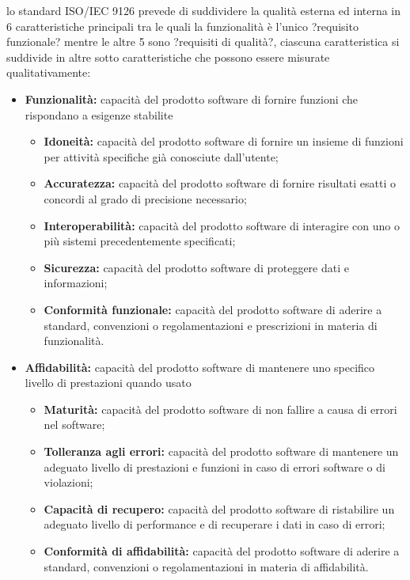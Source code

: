 \documentclass[a4paper]{article}
\begin{document}
				lo standard ISO/IEC 9126 prevede di suddividere la qualità esterna ed interna in 6 caratteristiche principali tra
				le quali la funzionalità è l'unico ?requisito funzionale?  mentre le altre 5 sono ?requisiti di qualità?, ciascuna
				caratteristica si suddivide in altre sotto caratteristiche che possono essere misurate qualitativamente:
				\begin{itemize}
					\item \textbf{Funzionalità:} capacità del prodotto software di fornire funzioni che rispondano
					a esigenze stabilite
					\begin{itemize}
						\item \textbf{Idoneità:} capacità del prodotto software di fornire un insieme di funzioni per attività
						specifiche già conosciute dall'utente;
						\item \textbf{Accuratezza:} capacità del prodotto software di fornire risultati esatti o concordi al grado di precisione necessario;
						\item \textbf{Interoperabilità:} capacità del prodotto software di interagire con uno o più sistemi 
						precedentemente specificati;
						\item \textbf{Sicurezza:} capacità del prodotto software di proteggere dati e informazioni;
						\item \textbf{Conformità funzionale:} capacità del prodotto software di aderire a standard, convenzioni
						o regolamentazioni e prescrizioni in materia di funzionalità.
					\end{itemize}
					
					\item \textbf{Affidabilità:} capacità del prodotto software di mantenere uno specifico livello di prestazioni
					quando usato
					\begin{itemize}
						\item \textbf{Maturità:} capacità del prodotto software di non fallire a causa di errori nel software;
						\item \textbf{Tolleranza agli errori:} capacità del prodotto software di mantenere un adeguato livello di
						prestazioni e funzioni in caso di errori software o di violazioni;
						\item \textbf{Capacità di recupero:} capacità del prodotto software di ristabilire un adeguato livello di
						performance e di recuperare i dati in caso di errori;
						\item \textbf{Conformità di affidabilità:} capacità del prodotto software di aderire a standard,
						convenzioni o regolamentazioni in materia di affidabilità.
					\end{itemize}										
					

\end{itemize}
\end{document}
